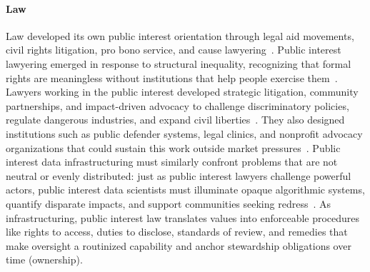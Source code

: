 \documentclass[acmsmall,screen]{acmart}
\begin{document}
\paragraph*{Law}
Law developed its own public interest orientation through legal aid movements, civil rights litigation, pro bono service, and cause lawyering~\cite{council1976balancing,rhode2004probono,sarat1998cause,cummings2009public}. Public interest lawyering emerged in response to structural inequality, recognizing that formal rights are meaningless without institutions that help people exercise them~\cite{southworth2005what,cummings2006after,trubek2011public}. Lawyers working in the public interest developed strategic litigation, community partnerships, and impact-driven advocacy to challenge discriminatory policies, regulate dangerous industries, and expand civil liberties~\cite{cummings2009public,nielsen2006organization,albiston2017public}. They also designed institutions such as public defender systems, legal clinics, and nonprofit advocacy organizations that could sustain this work outside market pressures~\cite{rhode2004probono,albiston2017public}. Public interest data infrastructuring must similarly confront problems that are not neutral or evenly distributed: just as public interest lawyers challenge powerful actors, public interest data scientists must illuminate opaque algorithmic systems, quantify disparate impacts, and support communities seeking redress~\cite{barocas2016big,selbst2019fairness}. As infrastructuring, public interest law translates values into enforceable procedures like rights to access, duties to disclose, standards of review, and remedies that make oversight a routinized capability and anchor stewardship obligations over time (ownership).
\end{document}
